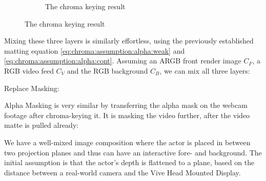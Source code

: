 \begin{figure}[htbp]
\begin{subfigure}[t]{.45\textwidth}
		\caption{The chroma keying result}
	\end{subfigure}
\end{figure}

Mixing these three layers is similarly effortless, using the previously 
established matting equation \eqref{eq:chroma:assumption:alpha:weak} and 
\eqref{eq:chroma:assumption:alpha:cont}. Assuming an ARGB front render image 
$C_F$, a RGB video feed  $C_V$ and the RGB background $C_B$, 
we can mix all three layers:

Replace Masking:







Alpha Masking is very similar by transferring the alpha mask on the webcam 
footage after chroma-keying it. It is masking the video further, after the 
video matte is pulled already:




We have a well-mixed image composition where the actor is placed in between 
two projection planes and thus can have an interactive fore- and background. 
The initial assumption is that the actor's depth is flattened to a plane, based 
on the distance between a real-world camera and the Vive Head Mounted Display.
